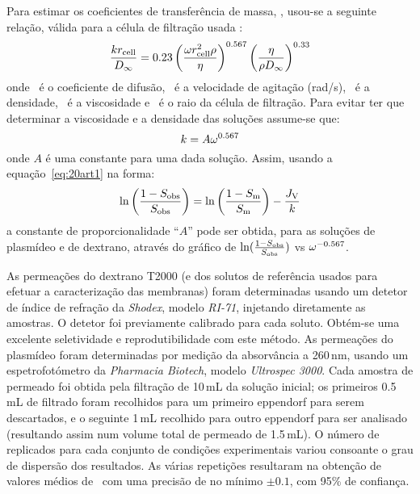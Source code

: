 Para estimar os coeficientes de transferência de massa, \coeficientemassa, usou-se a seguinte relação, válida para a célula de filtração usada \cite{opong,bowen97}:
%
\begin{equation}
\label{eq:21art1}
\frac{k r_{\mathrm{cell}}}{D_{\mathit{\infty}}}=0.23\left(\frac{\omega r_{\mathrm{cell}}^{2}\rho}{\eta}\right)^{0.567}\left(\frac{\eta}{\rho D_{\mathit{\infty}}}\right)^{0.33}  
\end{equation}
onde \dinf\ é o coeficiente de difusão, \agitacao\ é a velocidade de agitação (rad/s), \densidade\ é a densidade, \viscosidade\ é a viscosidade e \raiocelula\ é o raio da célula de filtração. Para evitar ter que determinar a viscosidade e a densidade das soluções assume-se que:
\begin{equation}
\label{eq:22art1}
k=A\omega^{0.567}
\end{equation}
onde $A$ é uma constante para uma dada solução. Assim, usando a equação~\ref{eq:20art1} na forma:
\begin{equation}
\label{eq:23art1}
  \ln \left( \frac{1-S_{\mathrm{obs}}}{S_{\mathrm{obs}}} \right) = 
	\ln \left( \frac{1-S_{\mathrm{m}}}{S_{\mathrm{m}}} \right) - \frac{J_{\mathrm{V}}}{k}	
\end{equation}
a constante de proporcionalidade ``$A$'' pode ser obtida, para as soluções de plasmídeo e de dextrano, através do gráfico de $\ln (\frac{1-S_{\mathrm{obs}}}{S_{\mathrm{obs}}})$ vs $\omega^{-0.567}$.

As permeações do dextrano T2000 (e dos solutos de referência usados para efetuar a caracterização das membranas) foram determinadas usando um detetor de índice de refração da \emph{Shodex}, modelo \emph{RI-71}, injetando diretamente as amostras.
%
%
O detetor foi previamente calibrado para cada soluto. Obtém-se uma excelente seletividade e reprodutibilidade com este método. As permeações do plasmídeo foram determinadas por medição da absorvância a 260\,nm, usando um espetrofotómetro da \emph{Pharmacia Biotech}, modelo \emph{Ultrospec 3000}.
%
%
Cada amostra de permeado foi obtida pela filtração de 10\,mL da solução inicial; os primeiros 0.5\,mL de filtrado foram recolhidos para um primeiro eppendorf para serem descartados, e o seguinte 1\,mL recolhido para outro eppendorf para ser analisado (resultando assim num volume total de permeado de 1.5\,mL).
%
O número de replicados para cada conjunto de condições experimentais variou consoante o grau de dispersão dos resultados. As várias repetições resultaram na obtenção de valores médios de \permobs\ com uma precisão de no mínimo $\pm 0.1$, com 95\% de confiança. 

